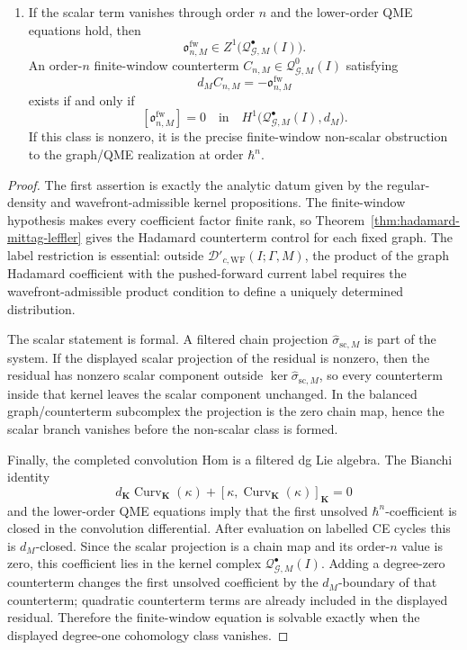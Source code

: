 \begin{thm}
\begin{enumerate}[label=(\arabic*)]
    \item If the scalar term vanishes through order \(n\) and the
    lower-order QME equations hold, then
    \[
      \mathfrak o^{\mathrm{fw}}_{n,M}
        \in Z^1\bigl(\mathcal Q^\bullet_{\mathcal G,M}(I)\bigr).
    \]
    An order-\(n\) finite-window counterterm
    \(C_{n,M}\in\mathcal Q^0_{\mathcal G,M}(I)\) satisfying
    \[
      d_M C_{n,M}=-\mathfrak o^{\mathrm{fw}}_{n,M}
    \]
    exists if and only if
    \[
      [\mathfrak o^{\mathrm{fw}}_{n,M}]
        =0
        \quad\text{in}\quad
      H^1\bigl(\mathcal Q^\bullet_{\mathcal G,M}(I),d_M\bigr).
    \]
    If this class is nonzero, it is the precise finite-window non-scalar
    obstruction to the graph/QME realization at order \(\hbar^n\).
  \end{enumerate}
\end{thm}

\begin{proof}
  The first assertion is exactly the analytic datum given by the
  regular-density and wavefront-admissible kernel propositions.  The
  finite-window hypothesis makes every coefficient factor finite rank, so
  Theorem~\ref{thm:hadamard-mittag-leffler} gives the Hadamard
  counterterm control for each fixed graph.  The label restriction is
  essential: outside
  \(\mathcal D'_{c,\mathrm{WF}}(I;\Gamma,M)\), the product of the graph
  Hadamard coefficient with the pushed-forward current label requires the
  wavefront-admissible product condition to define a uniquely determined
  distribution.

  The scalar statement is formal.  A filtered chain projection
  \(\widehat\sigma_{\mathrm{sc},M}\) is part of the system.  If the
  displayed scalar projection of the residual is nonzero, then the
  residual has nonzero scalar component outside
  \(\ker\widehat\sigma_{\mathrm{sc},M}\), so every counterterm inside that
  kernel leaves the scalar component unchanged.  In the balanced graph/counterterm
  subcomplex the projection is the zero chain map, hence the scalar branch
  vanishes before the non-scalar class is formed.

  Finally, the completed convolution Hom is a filtered dg Lie algebra.
  The Bianchi identity
  \[
    d_{\mathbf K}\operatorname{Curv}_{\mathbf K}(\kappa)
      +[\kappa,\operatorname{Curv}_{\mathbf K}(\kappa)]_{\mathbf K}=0
  \]
  and the lower-order QME equations imply that the first unsolved
  \(\hbar^n\)-coefficient is closed in the convolution differential.
  After evaluation on labelled CE cycles this is \(d_M\)-closed.
  Since the scalar projection
  is a chain map and its order-\(n\) value is zero, this coefficient lies
  in the kernel complex \(\mathcal Q^\bullet_{\mathcal G,M}(I)\).  Adding a
  degree-zero counterterm changes the first unsolved coefficient by the
  \(d_M\)-boundary of that counterterm; quadratic counterterm terms are
  already included in the displayed residual.  Therefore the finite-window
  equation is solvable exactly when the displayed degree-one cohomology
  class vanishes.
\end{proof}


